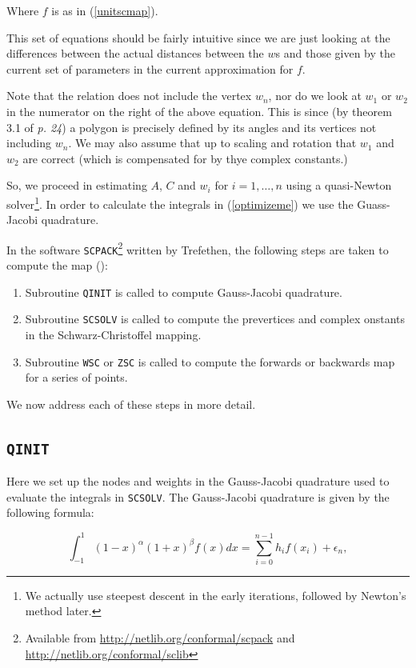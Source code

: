 \documentclass[a4paper,10pt]{amsart}
\newcommand{\sch}{Schwarz-Christoffel }
\begin{document}
Where $f$ is as in (\ref{unitscmap}).

This set of equations should be fairly intuitive since we are just looking at the differences between the actual distances between the $w$s and those given by the current set of parameters in the current approximation for $f$.

Note that the relation does not include the vertex $w_n$, nor do we look at $w_1$ or $w_2$ in the numerator on the right of the above equation. This is since (by theorem 3.1 of \cite{driscoll} \emph{p. 24}) a polygon is precisely defined by its angles and its vertices not including $w_n$. We may also assume that up to scaling and rotation that $w_1$ and $w_2$ are correct (which is compensated for by thye complex constants.)

So, we proceed in estimating $A$, $C$ and $w_i$ for $i=1,\dots,n$ using a quasi-Newton solver\footnote{We actually use steepest descent in the early iterations, followed by Newton's method later.}. In order to calculate the integrals in (\ref{optimizeme}) we use the Guass-Jacobi quadrature.

In the software \texttt{SCPACK}\footnote{Available from \url{http://netlib.org/conformal/scpack} and \url{http://netlib.org/conformal/sclib}} written by Trefethen, the following steps are taken to compute the map (\cite{scdoc}):

\begin{enumerate}
\item Subroutine \texttt{QINIT} is called to compute Gauss-Jacobi quadrature.
\item Subroutine \texttt{SCSOLV} is called to compute the prevertices and complex onstants in the \sch mapping.
\item Subroutine \texttt{WSC} or \texttt{ZSC} is called to compute the forwards or backwards map for a series of points.
\end{enumerate}

We now address each of these steps in more detail.

\subsection{\texttt{QINIT}}

Here we set up the nodes and weights in the Gauss-Jacobi quadrature used to evaluate the integrals in \texttt{SCSOLV}. The Gauss-Jacobi quadrature is given by the following formula:

\begin{equation}
\int_{-1}^{1} (1-x)^\alpha (1+x)^\beta f(x) dx = \sum_{i=0}^{n-1}h_if(x_i) + \epsilon_n,
\end{equation}
\end{document}
